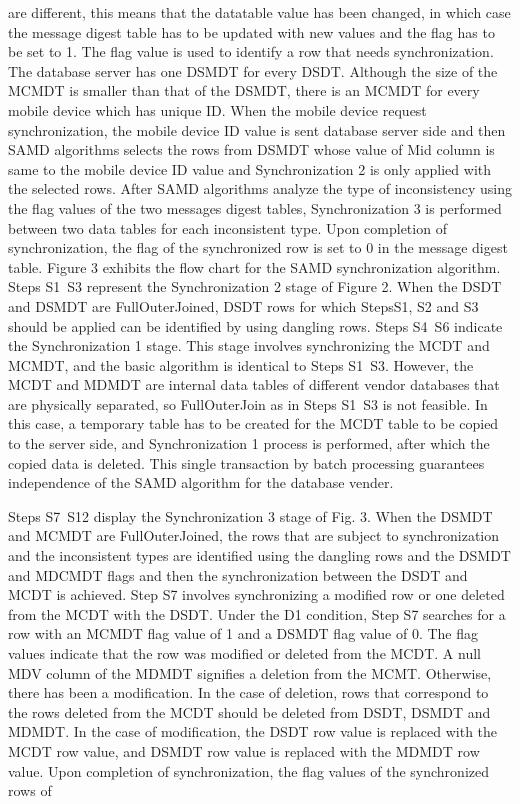 \documentclass[conference]{IEEEtran}
\begin{document}
\begin{enumerate}[label=(\Alph*)]
are different, this means that the datatable value has been changed, in which case the message digest table has to be updated with new values and the flag has to be set to 1. The flag value is used to identify a row that needs synchronization. The database server has one DSMDT for every DSDT. Although the size of the MCMDT is smaller than that of the DSMDT, there is an MCMDT for every mobile device which has unique ID. When the mobile
device request synchronization, the mobile device ID value is sent database server side and then SAMD algorithms selects the rows from DSMDT whose value of Mid column is same to the mobile device ID value and Synchronization 2
is only applied with the selected rows. After SAMD algorithms analyze the type of inconsistency using the flag values of the two messages digest tables, Synchronization 3 is performed between two data tables for each inconsistent
type. Upon completion of synchronization, the flag of the synchronized row is set to 0 in the message digest table. Figure 3 exhibits the flow chart for the SAMD synchronization algorithm. Steps S1~S3 represent the
Synchronization 2 stage of Figure 2. When the DSDT and DSMDT are FullOuterJoined, DSDT rows for which StepsS1, S2 and S3 should be applied can be identified by using dangling rows. Steps S4~S6 indicate the Synchronization 1
stage. This stage involves synchronizing the MCDT and MCMDT, and the basic algorithm is identical to Steps S1~S3. However, the MCDT and MDMDT are internal data tables of different vendor databases that are physically
separated, so FullOuterJoin as in Steps S1~S3 is not feasible. In this case, a temporary table has to be created for the MCDT table to be copied to the server side, and Synchronization 1 process is performed, after which the copied data is deleted. This single transaction by batch processing guarantees independence of the SAMD algorithm for the database vender.  

Steps S7~S12 display the Synchronization 3 stage of Fig. 3. When the DSMDT and MCMDT are FullOuterJoined, the rows that are subject to synchronization and the inconsistent types are identified using the dangling rows and the DSMDT and MDCMDT flags and then the synchronization between the DSDT and MCDT is achieved.  Step S7 involves synchronizing a modified row or one deleted from the MCDT with the DSDT. Under the D1 condition, Step S7 searches for a row with an MCMDT flag value of 1 and a DSMDT flag value of 0. The flag values indicate that the row was modified or deleted from the MCDT. A null MDV column of the MDMDT signifies a deletion from the MCMT. Otherwise, there has been a modification. In the case of deletion, rows that correspond to the rows deleted from the MCDT should be deleted from DSDT, DSMDT and MDMDT. In the case of modification, the DSDT row value is
replaced with the MCDT row value, and DSMDT row value is replaced with the MDMDT row value. Upon completion of synchronization, the flag values of the synchronized rows of 



\end{enumerate}
\end{document}
